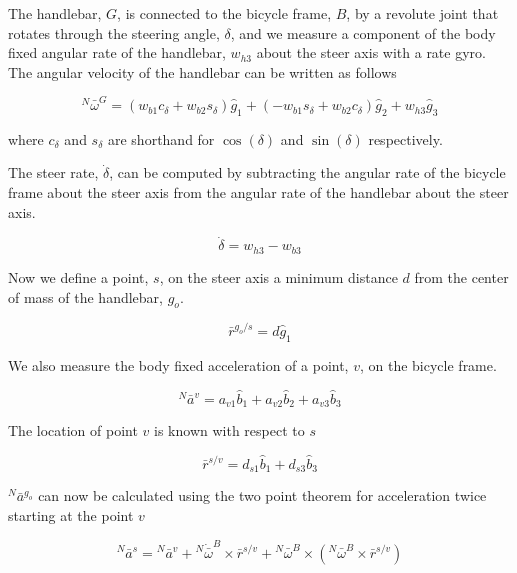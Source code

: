 \documentclass[a4paper]{article}
\begin{document}
The handlebar, $G$, is connected to the bicycle frame, $B$, by a revolute joint
that rotates through the steering angle, $\delta$, and we measure a component
of the body fixed angular rate of the handlebar, $w_{h3}$ about the steer axis
with a rate gyro. The angular velocity of the handlebar can be written as
follows

\begin{equation}
  ^N\bar{\omega}^G = (w_{b1}c_\delta + w_{b2}s_\delta)\hat{g}_1 +
  (-w_{b1}s_\delta + w_{b2}c_\delta)\hat{g}_2 +
  w_{h3}\hat{g}_3
\end{equation}

where $c_\delta$ and $s_\delta$ are shorthand for $\operatorname{cos}(\delta)$
and $\operatorname{sin}(\delta)$ respectively.

The steer rate, $\dot{\delta}$, can be computed by subtracting the angular rate
of the bicycle frame about the steer axis from the angular rate of the
handlebar about the steer axis.

\begin{equation}
  \dot{\delta} = w_{h3} - w_{b3}
\end{equation}

Now we define a point, $s$, on the steer axis a minimum distance $d$ from the
center of mass of the handlebar, $g_o$.

\begin{equation}
  \bar{r}^{g_o/s} = d\hat{g}_1
\end{equation}

We also measure the body fixed acceleration of a point, $v$, on the bicycle frame.

\begin{equation}
  ^N\bar{a}^v = a_{v1}\hat{b}_1 + a_{v2}\hat{b}_2 + a_{v3}\hat{b}_3
\end{equation}

The location of point $v$ is known with respect to $s$

\begin{equation}
  \bar{r}^{s/v} = d_{s1}\hat{b}_1 + d_{s3}\hat{b}_3
\end{equation}

$^N\bar{a}^{g_o}$ can now be calculated using the two point theorem for
acceleration \cite{Kane1985} twice starting at the point $v$

\begin{equation}
  ^N\bar{a}^s = {}^N\bar{a}^v +
    {}^N\dot{\bar{\omega}}^B\times\bar{r}^{s/v} +
    {}^N\bar{\omega}^B\times({}^N\bar{\omega}^B\times\bar{r}^{s/v})
\end{equation}
\end{document}
